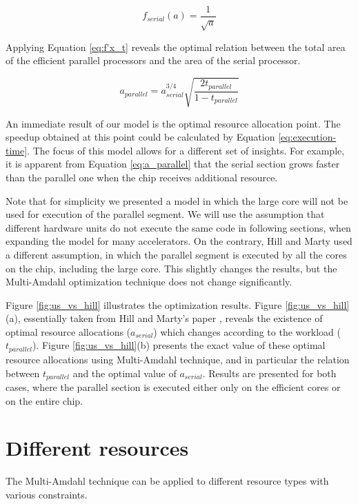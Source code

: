 \documentclass[twocolumn,english]{IEEEtran}
\begin{document}
\[
f_{serial}(a)=\frac{1}{\sqrt{a}}\]


Applying Equation \eqref{eq:f'x_t} reveals the optimal relation between
the total area of the efficient parallel processors and the area of
the serial processor.

\begin{equation}
a_{parallel}=a_{serial}^{3/4}\sqrt{\frac{2t_{parallel}}{1-t_{parallel}}}\label{eq:a_parallel}\end{equation}


An immediate result of our model is the optimal resource allocation
point. The speedup obtained at this point could be calculated by Equation
\eqref{eq:execution-time}. The focus of this model allows for a different
set of insights. For example, it is apparent from Equation \eqref{eq:a_parallel}
that the serial section grows faster than the parallel one when the
chip receives additional resource. 

Note that for simplicity we presented a model in which the large core
will not be used for execution of the parallel segment. We will use
the assumption that different hardware units do not execute the same
code in following sections, when expanding the model for many accelerators.
On the contrary, Hill and Marty \cite{hill2008amdahl} used a different
assumption, in which the parallel segment is executed by all the cores
on the chip, including the large core. This slightly changes the results,
but the Multi-Amdahl optimization technique does not change significantly. 



Figure \ref{fig:us_vs_hill} illustrates the optimization results.
Figure \ref{fig:us_vs_hill}(a), essentially taken from Hill and Marty's
paper \cite{hill2008amdahl}, reveals the existence of optimal resource
allocations ($a_{serial}$) which changes according to the workload
($t_{parallel}$). Figure \ref{fig:us_vs_hill}(b) presents the exact
value of these optimal resource allocations using Multi-Amdahl technique,
and in particular the relation between $t_{parallel}$ and the optimal
value of $a_{serial}.$ Results are presented for both cases, where
the parallel section is executed either only on the efficient cores
or on the entire chip.


\section{\label{sec:Resource}Different resources}

The Multi-Amdahl technique can be applied to different resource types
with various constraints.
\end{document}
